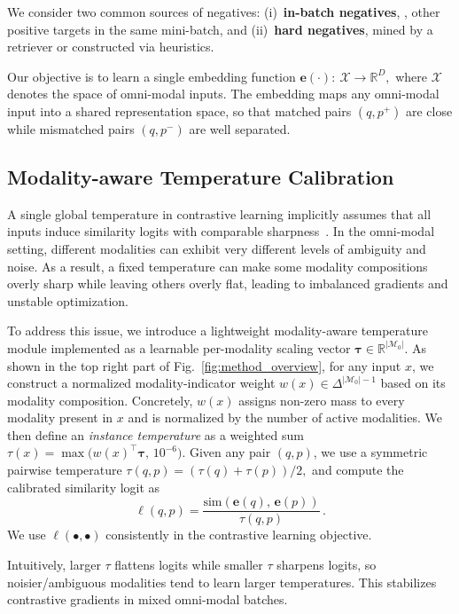 We consider two common sources of negatives: (i)~\textbf{in-batch negatives}, \eg, other positive targets in the same mini-batch, and
(ii)~\textbf{hard negatives}, mined by a retriever or constructed via heuristics.

Our objective is to learn a single embedding function $ \mathbf{e}(\cdot): \ \mathcal{X} \rightarrow \mathbb{R}^{D}, $
where $\mathcal{X}$ denotes the space of omni-modal inputs.
The embedding maps any omni-modal input into a shared representation space,
so that matched pairs $(q,p^{+})$ are close while mismatched pairs $(q,p^{-})$ are well separated.




\subsection{Modality-aware Temperature Calibration}
\label{subsec:method-modaltemp}

A single global temperature in contrastive learning implicitly assumes that all inputs induce similarity logits with comparable sharpness~\cite{simclr}.
In the omni-modal setting, different modalities can exhibit very different levels of ambiguity and noise.
As a result, a fixed temperature can make some modality compositions overly sharp while leaving others overly flat, leading to imbalanced gradients and unstable optimization.

To address this issue, we introduce a lightweight modality-aware temperature module implemented as a learnable per-modality scaling vector
$\boldsymbol{\tau}\in\mathbb{R}^{|\mathcal{M}_0|}$.
As shown in the top right part of Fig.~\ref{fig:method_overview}, for any input $x$, we construct a normalized modality-indicator weight
$w(x)\in\Delta^{|\mathcal{M}_0|-1}$ based on its modality composition.
Concretely, $w(x)$ assigns non-zero mass to every modality present in $x$ and is normalized by the number of active modalities.
We then define an \emph{instance temperature} as a weighted sum
$
\tau(x)=\max\!\big(w(x)^{\top}\boldsymbol{\tau},\,10^{-6}\big).
$
Given any pair $(q,p)$, we use a symmetric pairwise temperature
$
\tau(q,p)=\left(\tau(q)+\tau(p)\right)/2,
$
and compute the calibrated similarity logit as
\begin{equation}
\ell(q,p)=\frac{\mathrm{sim}(\mathbf{e}(q),\,\mathbf{e}(p))}{\tau(q,p)}\,.
\end{equation}
We use $\ell(\bullet,\bullet)$ consistently in the contrastive learning objective.


Intuitively, larger $\tau$ flattens logits while smaller $\tau$ sharpens logits, so noisier/ambiguous modalities tend to learn larger temperatures.
This stabilizes contrastive gradients in mixed omni-modal batches.




